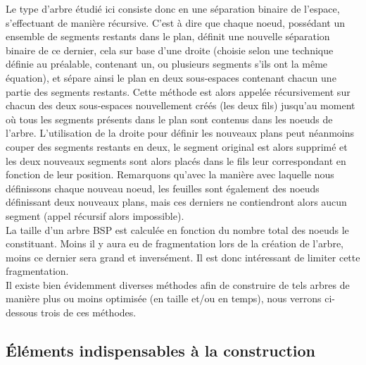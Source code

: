 \documentclass[11pt,a4paper]{article}
\begin{document}
Le type d'arbre étudié ici consiste donc en une séparation binaire de l'espace, s'effectuant de manière récursive. C'est à dire que chaque noeud, possédant un ensemble de segments restants dans le plan, définit une nouvelle séparation binaire de ce dernier, cela sur base d'une droite (choisie selon une technique définie au préalable, contenant un, ou plusieurs segments s'ils ont la même équation), et sépare ainsi le plan en deux sous-espaces contenant chacun une partie des segments restants. Cette méthode est alors appelée récursivement sur chacun des deux sous-espaces nouvellement créés (les deux fils) jusqu'au moment où tous les segments présents dans le plan sont contenus dans les noeuds de l'arbre. L'utilisation de la droite pour définir les nouveaux plans peut néanmoins couper des segments restants en deux, le segment original est alors supprimé et les deux nouveaux segments sont alors placés dans le fils leur correspondant en fonction de leur position. Remarquons qu'avec la manière avec laquelle nous définissons chaque nouveau noeud, les feuilles sont également des noeuds définissant deux nouveaux plans, mais ces derniers ne contiendront alors aucun segment (appel récursif alors impossible). \\

La taille d'un arbre BSP est calculée en fonction du nombre total des noeuds le constituant. Moins il y aura eu de fragmentation lors de la création de l'arbre, moins ce dernier sera grand et inversément. Il est donc intéressant de limiter cette fragmentation. \\

Il existe bien évidemment diverses méthodes afin de construire de tels arbres de manière plus ou moins optimisée (en taille et/ou en temps), nous verrons ci-dessous trois de ces méthodes. 

\subsection{Éléments indispensables à la construction}
\end{document}

